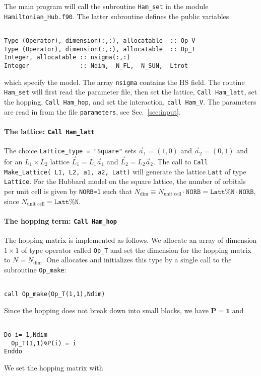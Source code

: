 The main program will call the subroutine   \texttt{Ham\_set} in the module \texttt{Hamiltonian\_Hub.f90}.
The latter  subroutine  defines the  public variables
\lstset{style=fortran}
\begin{lstlisting}

Type (Operator), dimension(:,:), allocatable  :: Op_V 
Type (Operator), dimension(:,:), allocatable  :: Op_T
Integer, allocatable :: nsigma(:,:)
Integer              :: Ndim,  N_FL,  N_SUN,  Ltrot

\end{lstlisting}
which specify the model. The array \texttt{nsigma} contains the HS field. The  routine \texttt{Ham\_set}  will first  read the parameter file,  then set the lattice, \texttt{Call Ham\_latt},  set the hopping, \texttt{Call Ham\_hop},  and set the interaction, 
\texttt{call Ham\_V}.  
The parameters are read in from the file \texttt{parameters}, see Sec.~\ref{sec:input}.

\paragraph{The lattice:   \texttt{Call Ham\_latt} }

The choice \texttt{Lattice\_type = "Square"} sets $\vec{a}_1 =  (1,0) $ and $\vec{a}_2 =  (0,1) $  and for an $L_1 \times L_2$  lattice  $\vec{L}_1 = L_1 \vec{a}_1$ and  $\vec{L}_2 = L_2 \vec{a}_2$.     The call to  \texttt{Call Make\_Lattice( L1, L2, a1,  a2, Latt)} will generate the lattice   \texttt{Latt} of type \texttt{Lattice}. 
For the Hubbard model on the square lattice, the number of orbitals per unit cell is given by \texttt{NORB=1} such that   $N_{\mathrm{dim}}   \equiv N_{\text{unit cell}}   \cdot \texttt{NORB}  = \texttt{Latt\%N} \cdot \texttt{NORB}$, since $N_{\text{unit cell}} = \texttt{Latt\%N}$.

\paragraph{The hopping term: \texttt{Call Ham\_hop}}

The hopping matrix is implemented as follows. 
We allocate an array of dimension $1\times 1$ of type operator  called \texttt{Op\_T} and set the  dimension for the hopping  matrix to $N=N_{\mathrm{dim}}$. One  allocates and initializes this type by a single call to the subroutine \texttt{Op\_make}: 
\begin{lstlisting}

call Op_make(Op_T(1,1),Ndim)

\end{lstlisting}
Since the hopping  does not  break down into small blocks, we have ${\bm P}=\mathds{1}$   and  
\begin{lstlisting}

Do i= 1,Ndim
  Op_T(1,1)%P(i) = i
Enddo

\end{lstlisting}
We set the hopping matrix  with 

